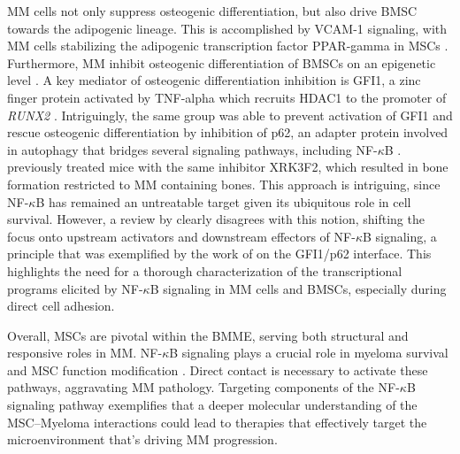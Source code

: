 \ac{MM} cells not only suppress osteogenic differentiation, but also drive
\ac{BMSC} towards the adipogenic lineage. This is accomplished by \ac{VCAM-1}
signaling, with MM cells stabilizing the adipogenic transcription factor
\ac{PPAR-gamma} in \acp{MSC} \cite{dotterweichContactMyelomaCells2016,
liuMyelomaCellsShift2020}. Furthermore, \ac{MM} inhibit osteogenic
differentiation of \acp{BMSC} on an epigenetic level
\cite{allegraEpigeneticCrosstalkMalignant2022}. A key mediator of osteogenic
differentiation inhibition is \ac{GFI1}, a zinc finger protein activated by
\ac{TNF-alpha} which recruits \ac{HDAC1} to the promoter of \textit{RUNX2}
\cite{dsouzaGfi1ExpressedBone2011, adamikEZH2HDAC1Inhibition2017}. Intriguingly,
the same group was able to prevent activation of \ac{GFI1} and rescue osteogenic
differentiation by inhibition of p62, an adapter protein involved in autophagy
that bridges several signaling pathways, including NF-$\kappa$B
\cite{adamikXRK3F2InhibitionP62ZZ2018}. \citet{teramachiBlockingZZDomain2016}
previously treated mice with the same inhibitor XRK3F2, which resulted in bone
formation restricted to MM containing bones. This approach is intriguing, since
NF-$\kappa$B has remained an untreatable target given its ubiquitous role in
cell survival. However, a review by \citet{verzellaNFkBPharmacopeiaNovel2022}
clearly disagrees with this notion,
shifting the focus onto upstream activators and downstream effectors of
NF-$\kappa$B signaling, a principle that was exemplified by the work of
\citet{adamikXRK3F2InhibitionP62ZZ2018} on the GFI1/p62 interface. This
highlights the need for a thorough characterization of the transcriptional
programs elicited by NF-$\kappa$B signaling in \ac{MM} cells and \acp{BMSC},
especially during direct cell adhesion.




Overall, \acp{MSC} are pivotal within the \ac{BMME}, serving both structural and
responsive roles in \ac{MM}. NF-$\kappa$B signaling plays a crucial role in
myeloma survival and MSC function modification
\cite{cippitelliRoleNFkBSignaling2023, royNFkBActivatingPathways2018}. Direct
contact is necessary to activate these pathways, aggravating \ac{MM} pathology.
Targeting components of the NF-$\kappa$B signaling pathway exemplifies that a
deeper molecular understanding of the MSC--Myeloma interactions could lead to
therapies that effectively target the microenvironment that's driving \ac{MM}
progression.










